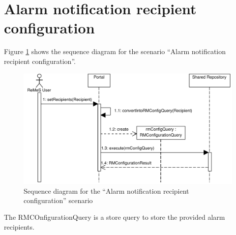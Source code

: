 \section{Alarm notification recipient configuration}
\label{scenario:rm-alarm-notification}

\npar Figure \ref{fig:scenario-5-3-4} shows the sequence diagram for the
scenario ``Alarm notification recipient configuration''.

\begin{figure}[H]
	\begin{centering}
		\includegraphics[width=\textwidth]{figs/scenario-5-3-4.pdf}
		\caption{Sequence diagram for the ``Alarm notification recipient configuration''
		scenario}
		\label{fig:scenario-5-3-4}
	\end{centering}
\end{figure}

\npar The RMCOnfigurationQuery is a store query to store the provided alarm
recipients.
